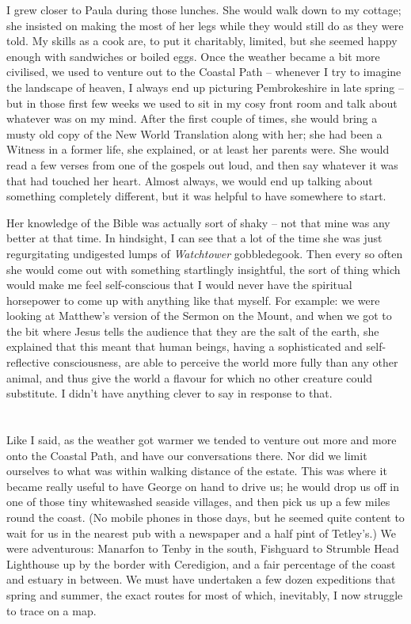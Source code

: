 I grew closer to Paula during those lunches. She would walk down to my cottage; she insisted on making the most of her legs while they would still do as they were told. My skills as a cook are, to put it charitably, limited, but she seemed happy enough with sandwiches or boiled eggs. Once the weather became a bit more civilised, we used to venture out to the Coastal Path -- whenever I try to imagine the landscape of heaven, I always end up picturing Pembrokeshire in late spring -- but in those first few weeks we used to sit in my cosy front room and talk about whatever was on my mind. After the first couple of times, she would bring a musty old copy of the New World Translation along with her; she had been a Witness in a former life, she explained, or at least her parents were. She would read a few verses from one of the gospels out loud, and then say whatever it was that had touched her heart. Almost always, we would end up talking about something completely different, but it was helpful to have somewhere to start.

Her knowledge of the Bible was actually sort of shaky -- not that mine was any better at that time. In hindsight, I can see that a lot of the time she was just regurgitating undigested lumps of \textit{Watchtower} gobbledegook. Then every so often she would come out with something startlingly insightful, the sort of thing which would make me feel self-conscious that I would never have the spiritual horsepower to come up with anything like that myself. For example: we were looking at Matthew's version of the Sermon on the Mount, and when we got to the bit where Jesus tells the audience that they are the salt of the earth, she explained that this meant that human beings, having a sophisticated and self-reflective consciousness, are able to perceive the world more fully than any other animal, and thus give the world a flavour for which no other creature could substitute. I didn't have anything clever to say in response to that.

\section{}

Like I said, as the weather got warmer we tended to venture out more and more onto the Coastal Path, and have our conversations there. Nor did we limit ourselves to what was within walking distance of the estate. This was where it became really useful to have George on hand to drive us; he would drop us off in one of those tiny whitewashed seaside villages, and then pick us up a few miles round the coast. (No mobile phones in those days, but he seemed quite content to wait for us in the nearest pub with a newspaper and a half pint of Tetley's.) We were adventurous: Manarfon to Tenby in the south, Fishguard to Strumble Head Lighthouse up by the border with Ceredigion, and a fair percentage of the coast and estuary in between. We must have undertaken a few dozen expeditions that spring and summer, the exact routes for most of which, inevitably, I now struggle to trace on a map.

